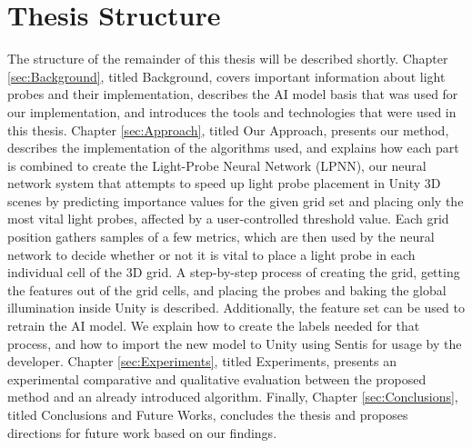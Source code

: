 \section{Thesis Structure} %
The structure of the remainder of this thesis will be described shortly. Chapter \ref{sec:Background}, titled Background, covers important information about light probes and their implementation, describes the AI model basis that was used for our implementation, and introduces the tools and technologies that were used in this thesis. Chapter \ref{sec:Approach}, titled Our Approach, presents our method, describes the implementation of the algorithms used, and explains how each part is combined to create the Light-Probe Neural Network (LPNN), our neural network system that attempts to speed up light probe placement in Unity 3D scenes by predicting importance values for the given grid set and placing only the most vital light probes, affected by a user-controlled threshold value. Each grid position gathers samples of a few metrics, which are then used by the neural network to decide whether or not it is vital to place a light probe in each individual cell of the 3D grid. A step-by-step process of creating the grid, getting the features out of the grid cells, and placing the probes and baking the global illumination inside Unity is described. Additionally, the feature set can be used to retrain the AI model. We explain how to create the labels needed for that process, and how to import the new model to Unity using Sentis for usage by the developer. Chapter \ref{sec:Experiments}, titled Experiments, presents an experimental comparative and qualitative evaluation between the proposed method and an already introduced algorithm. Finally, Chapter \ref{sec:Conclusions}, titled Conclusions and Future Works, concludes the thesis and proposes directions for future work based on our findings.












